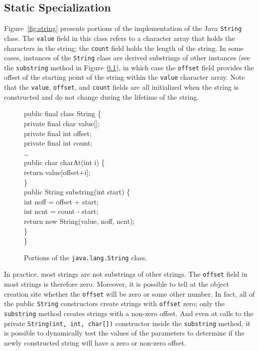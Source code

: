 \documentclass{acmconf}
\begin{document}
\subsection{Static Specialization} 

Figure~\ref{fig:string} presents portions of the implementation
of the Java {\tt String} class. The {\tt value} field in this
class refers to a character array that holds the characters
in the string; the {\tt count} field holds the length of the
string. In some cases, instances of the {\tt String} class
are derived substrings of other instances 
(see the {\tt substring} method in Figure~\ref{}), in which case the
{\tt offset} field provides the offset of the starting 
point of the string within the {\tt value} character array. 
Note that the {\tt value}, {\tt offset}, and {\tt count} 
fields are all initialized when the string is constructed
and do not change during the lifetime of the string.

\begin{figure}[tp]
\begin{samplecode}
public final class String \{\\
\>private final char value[];\\
\>private final int offset;\\
\>private final int count;\\
\>\ldots\\
\>public char charAt(int i) \{\\
\>\>return value[offset+i];\\
\>\}\\
\>public String substring(int start) \{\\
\>\>int noff = offset + start;\\
\>\>int ncnt = count - start;\\
\>\>return new String(value, noff, ncnt);\\
\>\}\\
\}\\
\end{samplecode}
\caption{Portions of the {\tt java.lang.String} class.}
\label{fig:string-fields}
\end{figure}

In practice, most strings are not substrings of other strings. 
The {\tt offset} field in most strings is therefore zero.
Moreover, it is possible to tell at the object creation site
whether the {\tt offset} will be zero or some other number.
In fact, all of the public {\tt String} constructors create
strings with {\tt offset} zero; only the {\tt substring} method
creates strings with a non-zero offset. And even at 
calls to the private {\tt String(int, int, char[])} constructor
inside the {\tt substring} method, it is possible to dynamically
test the values of the parameters to determine if the newly
constructed string will have a zero or non-zero offset.
\end{document}
